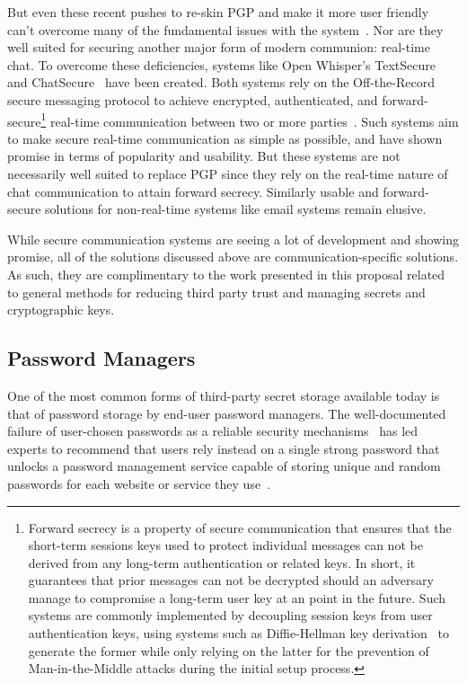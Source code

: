 But even these recent pushes to re-skin PGP and make it more user
friendly can't overcome many of the fundamental issues with the
system~\cite{green-pgp}. Nor are they well suited for securing another
major form of modern communion: real-time chat. To overcome these
deficiencies, systems like Open Whisper's
TextSecure~\cite{openwhisper} and ChatSecure~\cite{chatsecure} have
been created. Both systems rely on the Off-the-Record secure messaging
protocol to achieve encrypted, authenticated, and
forward-secure\footnote{Forward secrecy is a property of secure
  communication that ensures that the short-term sessions keys used to
  protect individual messages can not be derived from any long-term
  authentication or related keys. In short, it guarantees that prior
  messages can not be decrypted should an adversary manage to
  compromise a long-term user key at an point in the future. Such
  systems are commonly implemented by decoupling session keys from
  user authentication keys, using systems such as Diffie-Hellman key
  derivation~\cite{diffie1976} to generate the former while only
  relying on the latter for the prevention of Man-in-the-Middle
  attacks during the initial setup process.} real-time communication
between two or more parties~\cite{otr-v3, borisov2004,
  goldberg2009}. Such systems aim to make secure real-time
communication as simple as possible, and have shown promise in terms
of popularity and usability. But these systems are not necessarily
well suited to replace PGP since they rely on the real-time nature of
chat communication to attain forward secrecy. Similarly usable and
forward-secure solutions for non-real-time systems like email systems
remain elusive.

While secure communication systems are seeing a lot of development and
showing promise, all of the solutions discussed above are
communication-specific solutions. As such, they are complimentary to
the work presented in this proposal related to general methods for
reducing third party trust and managing secrets and cryptographic
keys.

\subsection{Password Managers}

One of the most common forms of third-party secret storage available
today is that of password storage by end-user password managers. The
well-documented failure of user-chosen passwords as a reliable
security mechanisms~\cite{goodin-bible, goodin-passwords} has led
experts to recommend that users rely instead on a single strong
password that unlocks a password management service capable of storing
unique and random passwords for each website or service they
use~\cite{schneier-passwords, krebs-passwords, brodkin-passman}.

